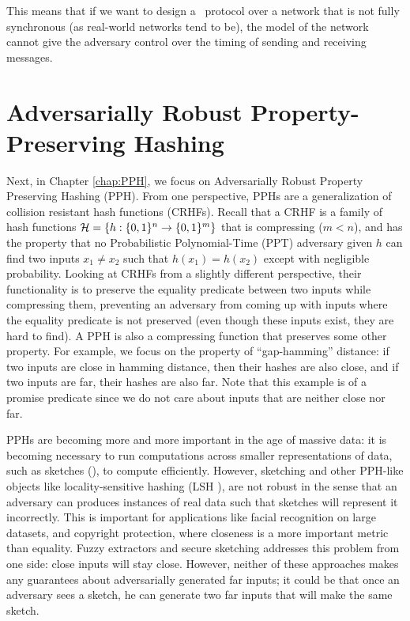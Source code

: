 This means that if we want to design a \THC~protocol over a network that is not fully synchronous (as real-world networks tend to be), the model of the network cannot give the adversary control over the timing of sending and receiving messages.


\section{Adversarially Robust Property-Preserving Hashing}
Next, in Chapter \ref{chap:PPH}, we focus on Adversarially Robust Property Preserving Hashing (PPH). From one perspective,
PPHs are a generalization of collision resistant hash functions (CRHFs). Recall that a CRHF is a family of hash functions ${\cal H} = \{ h:\{0,1\}^n \to \{0,1\}^m \}$ that is compressing ($m < n$), and has the property that no Probabilistic Polynomial-Time (PPT) adversary given $h$ can find two inputs $x_1 \neq x_2$ such that $h(x_1) = h(x_2)$ except with negligible probability. Looking at CRHFs from a slightly different perspective, their functionality is to preserve the equality predicate between two inputs while compressing them, preventing an adversary from coming up with inputs where the equality predicate is not preserved  (even though these inputs exist, they are hard to find). A PPH is also a compressing function that preserves some other property. For example, we focus on the property of ``gap-hamming'' distance: if two inputs are close in hamming distance, then their hashes are also close, and if two inputs are far, their hashes are also far. Note that this example is of a promise predicate since we do not care about inputs that are neither close nor far.

PPHs are becoming more and more important in the age of massive data: it is becoming necessary to run computations across smaller representations of data, such as sketches (\cite{MunroP80,DBLP:journals/scp/MisraG82,AlonMS96,CormodeM05,CharikarCF04}), to compute efficiently. However, sketching and other PPH-like objects like locality-sensitive hashing (LSH \cite{IndykM98}), are not robust in the sense that an adversary can produces instances of real data such that sketches will represent it incorrectly. This is important for applications like facial recognition on large datasets, and copyright protection, where closeness is a more important metric than equality. Fuzzy extractors and secure sketching addresses this problem from one side: close inputs will stay close. However, neither of these approaches makes any guarantees about adversarially generated far inputs; it could be that once an adversary sees a sketch, he can generate two far inputs that will make the same sketch.

